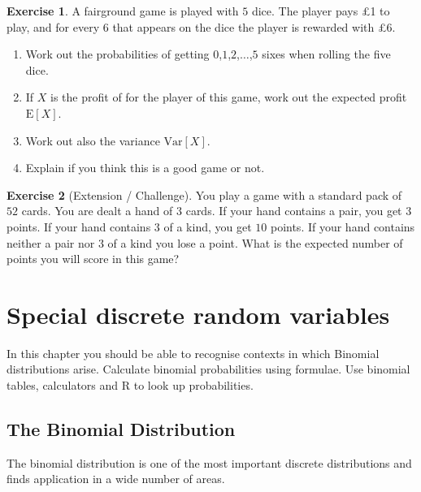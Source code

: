 \documentclass[
]{book}
\theoremstyle{definition}
\theoremstyle{definition}
\theoremstyle{definition}
\newtheorem{exercise}{Exercise}[chapter]
\theoremstyle{definition}
\theoremstyle{remark}
\begin{document}
\begin{exercise}

A fairground game is played with \(5\) dice. The player pays £1 to play, and for every \(6\) that appears on the dice the player is rewarded with £\(6\).

\begin{enumerate}
\def\labelenumi{\alph{enumi})}
\item
  Work out the probabilities of getting \(0\),\(1\),\(2\),\(\dots\),\(5\) sixes when rolling the five dice.
\item
  If \(X\) is the profit of for the player of this game, work out the expected profit \(\text{E}[X]\).
\item
  Work out also the variance \(\text{Var}[X]\).
\item
  Explain if you think this is a good game or not.
\end{enumerate}

\end{exercise}

\begin{exercise}[Extension / Challenge]
You play a game with a standard pack of \(52\) cards. You are dealt a hand of \(3\) cards. If your hand contains a pair, you get \(3\) points. If your hand contains \(3\) of a kind, you get \(10\) points. If your hand contains neither a pair nor \(3\) of a kind you lose a point. What is the expected number of points you will score in this game?
\end{exercise}

\hypertarget{binpois}{%
\chapter{Special discrete random variables}\label{binpois}}

In this chapter you should be able to recognise contexts in which Binomial distributions arise. Calculate binomial probabilities using formulae. Use binomial tables, calculators and R to look up probabilities.

\hypertarget{the-binomial-distribution}{%
\section{The Binomial Distribution}\label{the-binomial-distribution}}

The binomial distribution is one of the most important discrete distributions and finds application in a wide number of areas.
\end{document}
